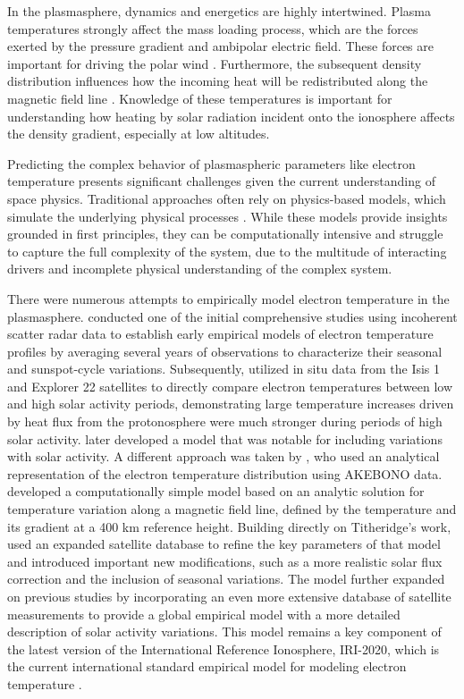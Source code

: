 \documentclass{agujournal2019}
\begin{document}
In the plasmasphere, dynamics and energetics are highly intertwined. Plasma temperatures strongly affect the mass loading process, which are the forces exerted by the pressure gradient and ambipolar electric field. These forces are important for driving the polar wind \citep{kitamura_solar_2011}. Furthermore, the subsequent density distribution influences how the incoming heat will be redistributed along the magnetic field line \citep{khazanov_inertia_2024}. Knowledge of these temperatures is important for understanding how heating by solar radiation incident onto the ionosphere affects the density gradient, especially at low altitudes. 

Predicting the complex behavior of plasmaspheric parameters like electron temperature presents significant challenges given the current understanding of space physics. Traditional approaches often rely on physics-based models, which simulate the underlying physical processes \citep{liemohn_ring_2000}. While these models provide insights grounded in first principles, they can be computationally intensive and struggle to capture the full complexity of the system, due to the multitude of interacting drivers and incomplete physical understanding of the complex system.

There were numerous attempts to empirically model electron temperature in the plasmasphere. \cite{evans_seasonal_1973} conducted one of the initial comprehensive studies using incoherent scatter radar data to establish early empirical models of electron temperature profiles by averaging several years of observations to characterize their seasonal and sunspot-cycle variations. Subsequently, \cite{mahajan_solar_1979} utilized in situ data from the Isis 1 and Explorer 22 satellites to directly compare electron temperatures between low and high solar activity periods, demonstrating large temperature increases driven by heat flux from the protonosphere were much stronger during periods of high solar activity. \cite{bilitza_solar_1990} later developed a model that was notable for including variations with solar activity. A different approach was taken by \cite{kutiev_analytical_2002}, who used an analytical representation of the electron temperature distribution using AKEBONO data.  \cite{titheridge_temperatures_1998} developed a computationally simple model based on an analytic solution for temperature variation along a magnetic field line, defined by the temperature and its gradient at a 400 km reference height. Building directly on Titheridge's work, \cite{webb_modifications_2003} used an expanded satellite database to refine the key parameters of that model and introduced important new modifications, such as a more realistic solar flux correction and the inclusion of seasonal variations. The \cite{truhlik_new_2012} model further expanded on previous studies by incorporating an even more extensive database of satellite measurements to provide a global empirical model with a more detailed description of solar activity variations. This model remains a key component of the latest version of the International Reference Ionosphere, IRI-2020, which is the current international standard empirical model for modeling electron temperature \citep{bilitza_international_2022}.
\end{document}
